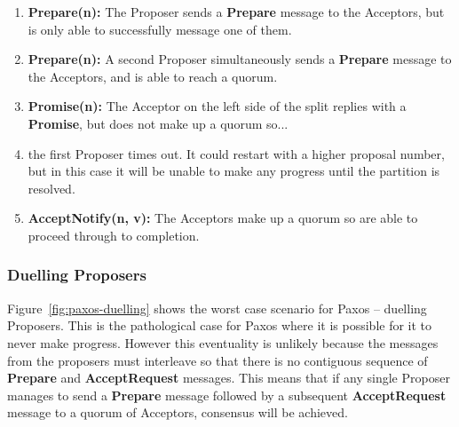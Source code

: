 \documentclass[12pt,twoside,notitlepage]{report}
\newcommand{\msg}[1] {{\bf #1}}         %
\begin{document}
\begin{enumerate}
\item \msg{Prepare(n):} The Proposer sends a \msg{Prepare} message to the Acceptors, but is only
	able to successfully message one of them.
\item \msg{Prepare(n):} A second Proposer simultaneously sends a \msg{Prepare} message to the
	Acceptors, and is able to reach a quorum.
\item \msg{Promise(n):} The Acceptor on the left side of the split replies with a \msg{Promise},
	but does not make up a quorum so...
\item the first Proposer times out. It could restart with a higher proposal number, but in this
	case it will be unable to make any progress until the partition is resolved.
\item \msg{AcceptNotify(n, v):} The Acceptors make up a quorum so are able to proceed through to
	completion.
\end{enumerate}

\subsubsection*{Duelling Proposers}

Figure~\ref{fig:paxos-duelling} shows the worst case scenario
for Paxos -- duelling Proposers. This is the pathological case for Paxos where it is possible for
it to never make progress. However this eventuality is unlikely because the messages from the proposers
must interleave so that there is no contiguous sequence of \msg{Prepare} and \msg{AcceptRequest}
messages. This means that if any single Proposer manages to send a \msg{Prepare} message followed by a
subsequent \msg{AcceptRequest} message to a quorum of Acceptors, consensus will be achieved.
\end{document}
